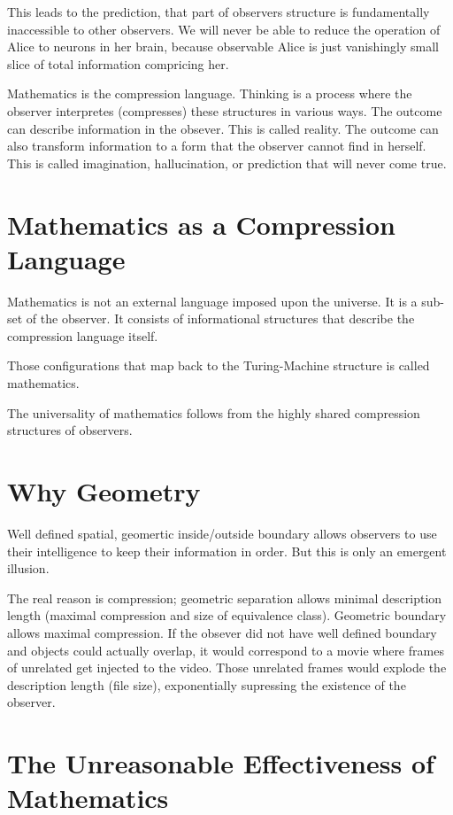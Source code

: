 This leads to the prediction, that part of observers structure is
fundamentally inaccessible to other observers. 
We will never be able to reduce the operation of Alice to
neurons in her brain, because observable Alice is just vanishingly
small slice of total information compricing her. 

Mathematics is the compression language. Thinking is a process where the observer interpretes (compresses) these structures in various ways.
The outcome can describe information in the obsever. This is called reality. The outcome can also transform information to a form
that the observer cannot find in herself. This is called imagination, hallucination, or prediction that will never come true.


\section{Mathematics as a Compression Language}

Mathematics is not an external language imposed upon the universe.
It is a sub-set of the observer. It consists of informational structures that describe the compression
language itself.

Those configurations that map back to the Turing-Machine structure is called mathematics.

The universality of mathematics follows from the highly shared compression
structures of observers. 


\section{Why Geometry}

Well defined spatial, geomertic inside/outside boundary allows observers to use their intelligence to
keep  their information in order. But this is only an emergent illusion.

The real reason is compression; geometric separation allows minimal description length (maximal compression and size of equivalence class).
Geometric boundary allows maximal compression. If the obsever did not have well defined boundary and objects could actually overlap,
it would correspond to a movie where frames of unrelated get injected to the video. Those
unrelated frames would explode the description length (file size), exponentially supressing the existence of the observer.


\section{The Unreasonable Effectiveness of Mathematics}

